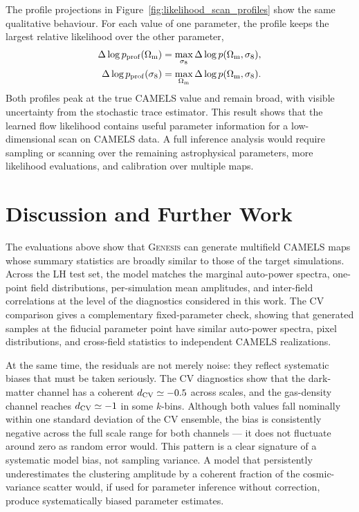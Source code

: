 \documentclass{article}
\newcommand{\Om}{\Omega_{\rm m}}
\newcommand{\sig}{\sigma_8}
\begin{document}
The profile projections in
Figure~\ref{fig:likelihood_scan_profiles} show the same qualitative
behaviour. For each value of one parameter, the profile keeps the
largest relative likelihood over the other parameter,
\begin{equation}
\begin{aligned}
  \Delta\log p_{\rm prof}(\Om)
  =
  \max_{\sig}
  \Delta\log p(\Om,\sig),
  \\
  \Delta\log p_{\rm prof}(\sig)
  =
  \max_{\Om}
  \Delta\log p(\Om,\sig).
\end{aligned}
  \label{eq:profile_likelihood}
\end{equation}
Both profiles peak at the true CAMELS value and remain broad, with
visible uncertainty from the stochastic trace estimator. This result
shows that the learned flow likelihood contains useful parameter
information for a low-dimensional scan on CAMELS data. A full
inference analysis would require sampling or scanning over the
remaining astrophysical parameters, more likelihood evaluations, and
calibration over multiple maps.

\section{Discussion and Further Work}
\label{sec:discussion}

The evaluations above show that \textsc{Genesis} can generate
multifield CAMELS maps whose summary statistics are broadly similar
to those of the target simulations. Across the LH test set, the model
matches the marginal auto-power spectra, one-point field
distributions, per-simulation mean amplitudes, and inter-field
correlations at the level of the diagnostics considered in this work.
The CV comparison gives a complementary fixed-parameter check,
showing that generated samples at the fiducial parameter point have
similar auto-power spectra, pixel distributions, and cross-field
statistics to independent CAMELS realizations.

At the same time, the residuals are not merely noise: they reflect
systematic biases that must be taken seriously. The CV diagnostics
show that the dark-matter channel has a coherent $d_{\rm CV}\simeq
-0.5$ across scales, and the gas-density channel reaches $d_{\rm
CV}\simeq -1$ in some $k$-bins. Although both values fall nominally
within one standard deviation of the CV ensemble, the bias is
consistently negative across the full scale range for both channels
--- it does not fluctuate around zero as random error would. This
pattern is a clear signature of a systematic model bias, not sampling
variance. A model that persistently underestimates the clustering
amplitude by a coherent fraction of the cosmic-variance scatter
would, if used for parameter inference without correction, produce
systematically biased parameter estimates. 
\end{document}
